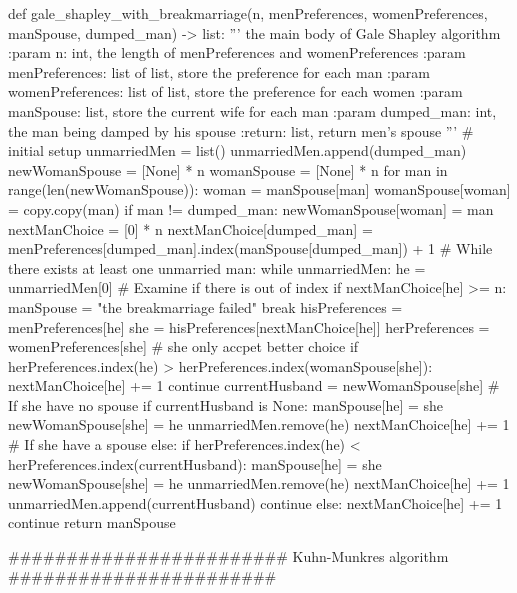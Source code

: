 \documentclass[14pt]{extarticle}
\begin{document}
\begin{python}
def gale_shapley_with_breakmarriage(n, menPreferences, womenPreferences, manSpouse, dumped_man) -> list:
    '''
    the main body of Gale Shapley algorithm
    :param n: int, the length of menPreferences and womenPreferences
    :param menPreferences: list of list, store the preference for each man
    :param womenPreferences: list of list, store the preference for each women
    :param manSpouse: list, store the current wife for each man
    :param dumped_man: int, the man being damped by his spouse
    :return: list, return men's spouse
    '''
    # initial setup
    unmarriedMen = list()
    unmarriedMen.append(dumped_man)    
    newWomanSpouse = [None] * n
    womanSpouse = [None] * n
    for man in range(len(newWomanSpouse)):
        woman = manSpouse[man]        
        womanSpouse[woman] = copy.copy(man)
        if man != dumped_man:
            newWomanSpouse[woman] = man 
    nextManChoice = [0] * n
    nextManChoice[dumped_man] = menPreferences[dumped_man].index(manSpouse[dumped_man]) + 1
    # While there exists at least one unmarried man:
    while unmarriedMen: 
        he = unmarriedMen[0]
        # Examine if there is out of index    
        if nextManChoice[he] >= n:
            manSpouse = "the breakmarriage failed"
            break 
        hisPreferences = menPreferences[he]
        she = hisPreferences[nextManChoice[he]]
        herPreferences = womenPreferences[she]
        # she only accpet better choice
        if herPreferences.index(he) > herPreferences.index(womanSpouse[she]):
            nextManChoice[he] += 1
            continue 
        currentHusband = newWomanSpouse[she]
        # If she have no spouse        
        if currentHusband is None:
            manSpouse[he] = she
            newWomanSpouse[she] = he
            unmarriedMen.remove(he)
            nextManChoice[he] += 1 
        # If she have a spouse    
        else:
            if herPreferences.index(he) < herPreferences.index(currentHusband):
                manSpouse[he] = she
                newWomanSpouse[she] = he
                unmarriedMen.remove(he)
                nextManChoice[he] += 1
                unmarriedMen.append(currentHusband)
                continue
            else:
                nextManChoice[he] += 1
                continue  
    return manSpouse

######################## Kuhn-Munkres algorithm #######################


\end{python}
\end{document}
